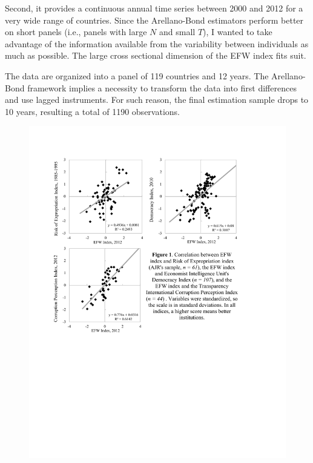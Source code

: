 \documentclass{article}
\begin{document}
Second, it provides a continuous annual time series between 2000 and 2012 for a very wide range of countries. Since the Arellano-Bond estimators perform better on short panels (i.e., panels with large $N$ and small $T$), I wanted to take advantage of the information available from the variability between individuals as much as possible. The large cross sectional dimension of the EFW index fits suit.  

The data are organized into a panel of 119 countries and 12 years. The Arellano-Bond framework implies a necessity to transform the data into first differences and use lagged instruments. For such reason, the final estimation sample drops to 10 years, resulting a total of 1190 observations. 

\newpage

\begin{figure}[ht]
\begin{center}
    \includegraphics[scale=0.7]{correlation.pdf}
\end{center}
\end{figure}
\end{document}
